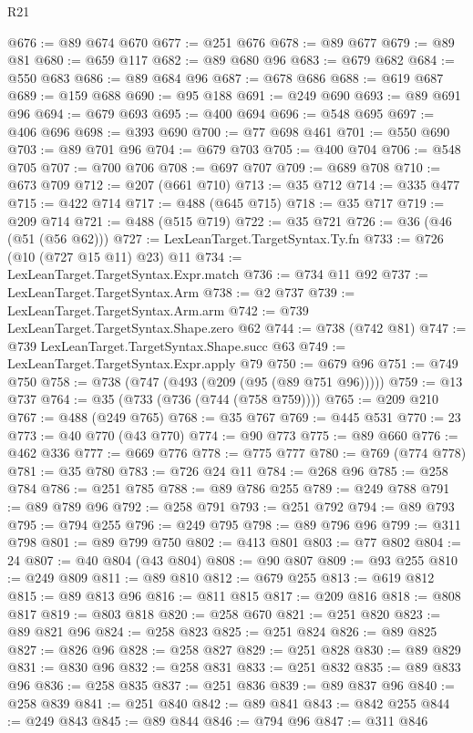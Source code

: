 \begin{lexlean}{R21}
\begin{coremodule}
@676 := @89 @674 @670
@677 := @251 @676
@678 := @89 @677
@679 := @89 @81
@680 := @659 @117
@682 := @89 @680 @96
@683 := @679 @682
@684 := @550 @683
@686 := @89 @684 @96
@687 := @678 @686
@688 := @619 @687
@689 := @159 @688
@690 := @95 @188
@691 := @249 @690
@693 := @89 @691 @96
@694 := @679 @693
@695 := @400 @694
@696 := @548 @695
@697 := @406 @696
@698 := @393 @690
@700 := @77 @698 @461
@701 := @550 @690
@703 := @89 @701 @96
@704 := @679 @703
@705 := @400 @704
@706 := @548 @705
@707 := @700 @706
@708 := @697 @707
@709 := @689 @708
@710 := @673 @709
@712 := @207 (@661 @710)
@713 := @35 @712
@714 := @335 @477
@715 := @422 @714
@717 := @488 (@645 @715)
@718 := @35 @717
@719 := @209 @714
@721 := @488 (@515 @719)
@722 := @35 @721
@726 := @36 (@46 (@51 (@56 @62)))
@727 := LexLeanTarget.TargetSyntax.Ty.fn
@733 := @726 (@10 (@727 @15 @11) @23) @11
@734 := LexLeanTarget.TargetSyntax.Expr.match
@736 := @734 @11 @92
@737 := LexLeanTarget.TargetSyntax.Arm
@738 := @2 @737
@739 := LexLeanTarget.TargetSyntax.Arm.arm
@742 := @739 LexLeanTarget.TargetSyntax.Shape.zero @62
@744 := @738 (@742 @81)
@747 := @739 LexLeanTarget.TargetSyntax.Shape.succ @63
@749 := LexLeanTarget.TargetSyntax.Expr.apply @79
@750 := @679 @96
@751 := @749 @750
@758 := @738 (@747 (@493 (@209 (@95 (@89 @751 @96)))))
@759 := @13 @737
@764 := @35 (@733 (@736 (@744 (@758 @759))))
@765 := @209 @210
@767 := @488 (@249 @765)
@768 := @35 @767
@769 := @445 @531
@770 := 23
@773 := @40 @770 (@43 @770)
@774 := @90 @773
@775 := @89 @660
@776 := @462 @336
@777 := @669 @776
@778 := @775 @777
@780 := @769 (@774 @778)
@781 := @35 @780
@783 := @726 @24 @11
@784 := @268 @96
@785 := @258 @784
@786 := @251 @785
@788 := @89 @786 @255
@789 := @249 @788
@791 := @89 @789 @96
@792 := @258 @791
@793 := @251 @792
@794 := @89 @793
@795 := @794 @255
@796 := @249 @795
@798 := @89 @796 @96
@799 := @311 @798
@801 := @89 @799 @750
@802 := @413 @801
@803 := @77 @802
@804 := 24
@807 := @40 @804 (@43 @804)
@808 := @90 @807
@809 := @93 @255
@810 := @249 @809
@811 := @89 @810
@812 := @679 @255
@813 := @619 @812
@815 := @89 @813 @96
@816 := @811 @815
@817 := @209 @816
@818 := @808 @817
@819 := @803 @818
@820 := @258 @670
@821 := @251 @820
@823 := @89 @821 @96
@824 := @258 @823
@825 := @251 @824
@826 := @89 @825
@827 := @826 @96
@828 := @258 @827
@829 := @251 @828
@830 := @89 @829
@831 := @830 @96
@832 := @258 @831
@833 := @251 @832
@835 := @89 @833 @96
@836 := @258 @835
@837 := @251 @836
@839 := @89 @837 @96
@840 := @258 @839
@841 := @251 @840
@842 := @89 @841
@843 := @842 @255
@844 := @249 @843
@845 := @89 @844
@846 := @794 @96
@847 := @311 @846

\end{coremodule}
\end{lexlean}
